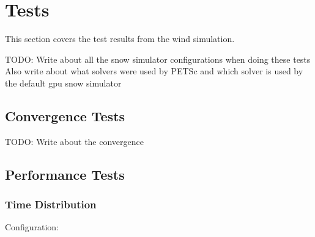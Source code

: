 \section{Tests}

This section covers the test results from the wind simulation. 

TODO: Write about all the snow simulator configurations when doing these tests
Also write about what solvers were used by PETSc and which solver is used
by the default gpu snow simulator

\subsection{Convergence Tests}

TODO: Write about the convergence

\subsection{Performance Tests}

\subsubsection{Time Distribution}

Configuration:

